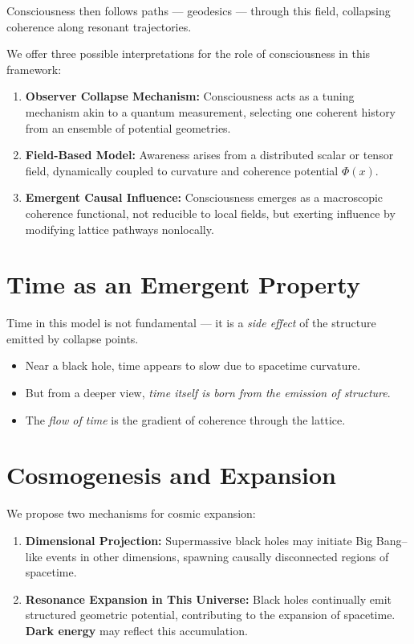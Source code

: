 \documentclass[12pt]{article}
\begin{document}
Consciousness then follows paths — geodesics — through this field, collapsing coherence along resonant trajectories.

We offer three possible interpretations for the role of consciousness in this framework:

\begin{enumerate}
    \item \textbf{Observer Collapse Mechanism:} Consciousness acts as a tuning mechanism akin to a quantum measurement, selecting one coherent history from an ensemble of potential geometries.
    \item \textbf{Field-Based Model:} Awareness arises from a distributed scalar or tensor field, dynamically coupled to curvature and coherence potential \(\Phi(x)\).
    \item \textbf{Emergent Causal Influence:} Consciousness emerges as a macroscopic coherence functional, not reducible to local fields, but exerting influence by modifying lattice pathways nonlocally.
\end{enumerate}

\section{Time as an Emergent Property}
Time in this model is not fundamental — it is a \emph{side effect} of the structure emitted by collapse points.

\begin{itemize}[noitemsep,topsep=0.5em]
\item Near a black hole, time appears to slow due to spacetime curvature.
\item But from a deeper view, \emph{time itself is born from the emission of structure}.
\item The \emph{flow of time} is the gradient of coherence through the lattice.
\end{itemize}

\section{Cosmogenesis and Expansion}
We propose two mechanisms for cosmic expansion:

\begin{enumerate}[noitemsep,topsep=0.5em]
\item \textbf{Dimensional Projection:} Supermassive black holes may initiate Big Bang–like events in other dimensions, spawning causally disconnected regions of spacetime.
\item \textbf{Resonance Expansion in This Universe:} Black holes continually emit structured geometric potential, contributing to the expansion of spacetime. \textbf{Dark energy} may reflect this accumulation.
\end{enumerate}
\end{document}
